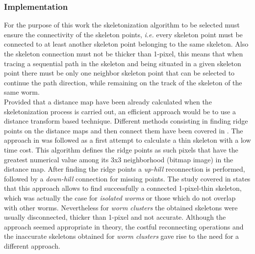 \subsubsection{Implementation}
\label{sec:skeletonimp}

For the purpose of this work the skeletonization algorithm to be selected must
ensure the connectivity of the skeleton points, \emph{i.e.} every skeleton point
must be connected to at least another skeleton point belonging to the same
skeleton. Also the skeleton connection must not be thicker than 1-pixel, this means that
when tracing a sequential path in the skeleton and being situated in a given skeleton 
point there must be only one neighbor skeleton point that can be selected to continue
the path direction, while remaining on the track of the skeleton of the same worm.\\

Provided that a distance map have been already calculated when the skeletonization 
process is carried out, an efficient approach would be to use a distance transform
based technique. Different methods consisting in finding ridge points on the distance
maps and then connect them have been covered in \cite{maxima,euclideancentre,ridgeineuc}.
The approach in \cite{maxima} was followed as a first attempt to calculate a thin
skeleton with a low time cost. This algorithm defines the ridge points as such pixels
that have the greatest numerical value among its 3x3 neighborhood (bitmap image) in the 
distance map. After finding the ridge points a \emph{up-hill} reconnection is performed, 
followed by a \emph{down-hill} connection for missing points. The study covered in \cite{maxima}
states that this approach allows to find successfully a connected 1-pixel-thin skeleton,
which was actually the case for \emph{isolated worms} or those which do not
overlap with other worms. Nevertheless for \emph{worm clusters} the obtained skeletons
were usually disconnected, thicker than 1-pixel and not accurate. Although the approach
seemed appropriate in theory, the costful reconnecting operations and the inaccurate
skeletons obtained for \emph{worm clusters} gave rise to the need for a different
approach.\\

